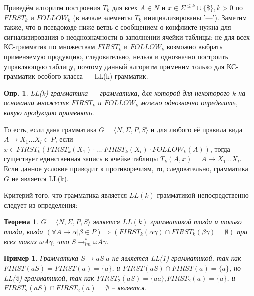 \documentclass[10pt]{article}         %
\newtheorem{definition}{Опр.}
\newtheorem{example}{Пример}
\newtheorem{theorem}{Теорема}
\begin{document}
	Приведём алгоритм построения $T_k$ для всех $A \in N$ и $x \in \Sigma^{\leq{k}}\cup{\{\$\}}, k > 0$ по $FIRST_k$ и $FOLLOW_k$ (в начале элементы $T_k$ инициализированы '---'). Заметим также, что в псевдокоде ниже ветвь с сообщением о конфликте нужна для сигнализирования о неоднозначности в заполнении ячейки таблицы: не для всех КС-грамматик по множествам $FIRST_{k}$ и $FOLLOW_{k}$ возможно выбрать применяемую продукцию, следовательно, нельзя и однозначно построить управляющую таблицу, поэтому данный алгоритм применим только для КС-грамматик особого класса --- LL(k)-грамматик.
	
	\begin{algorithm}[tbh]\label{alg:TK}
		\begin{algorithmic}
		
			\Else
			\EndIf
			\EndFor
			\EndFor
		\end{algorithmic}
	\end{algorithm}
	
	\begin{definition}
		LL(k) грамматика --- грамматика, для которой для некоторого $k$ на основании множеств $FIRST_{k}$ и $FOLLOW_{k}$ можно однозначно определить, какую продукцию применять. 
	\end{definition}
	 То есть, если дана грамматика $G = \langle N, \Sigma, P, S \rangle$ и для любого её правила вида $A \to X_1\dots{X_l} \in P$, если $x \in FIRST_k(FIRST_k(X_1)\cdot{}\dots{\cdot{}{FIRST_k(X_l)}}\cdot{FOLLOW_k(A)})$, тогда существует единственная запись в ячейке таблицы $T_k(A,x)=A \to X_1\dots{X_l}$. Если данное условие приводит к противоречиям, то, следовательно, грамматика $G$ не является LL(k).
	
	Критерий того, что грамматика является $LL(k)$ грамматикой непосредственно следует из определения:
	
	\begin{theorem} 
		$G = \langle N, \Sigma, P, S \rangle$ является $LL(k)$ грамматикой тогда и только тогда, когда
		$(\forall A \to \alpha|\beta \in P) \Rightarrow ({FIRST_k(\alpha\gamma)\cap{FIRST_k(\beta\gamma)}}=\emptyset)$ при всех таких $\omega A \gamma$, что $S \to_{lm}^* \omega A \gamma$.
	\end{theorem}
	
	\begin{example}
		Грамматика $S \to aS | a$ не является LL(1)-грамматикой, так как $FIRST(aS)=FIRST(a)=\{a\}$, и $FIRST(aS)\cap{FIRST(a)}=\{a\}$, но LL(2)-грамматикой, так как $FIRST_2(aS)=\{aa\}$,$ FIRST_2(a)=\{a\}$, и $FIRST_2(aS)\cap{FIRST_2(a)}=\emptyset$ -- является.
	\end{example}
	
\end{document}
